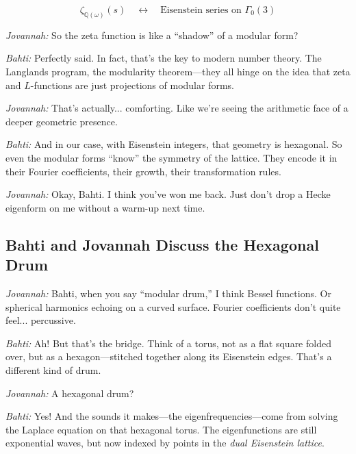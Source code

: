 \[
\zeta_{\mathbb{Q}(\omega)}(s) \quad \longleftrightarrow \quad \text{Eisenstein series on } \Gamma_0(3)
\]

\medskip

\noindent
\textit{Jovannah:} So the zeta function is like a “shadow” of a modular form?

\medskip

\noindent
\textit{Bahti:} Perfectly said. In fact, that’s the key to modern number theory. The Langlands program, the modularity theorem—they all hinge on the idea that zeta and \( L \)-functions are just projections of modular forms.

\medskip

\noindent
\textit{Jovannah:} That’s actually... comforting. Like we’re seeing the arithmetic face of a deeper geometric presence.

\medskip

\noindent
\textit{Bahti:} And in our case, with Eisenstein integers, that geometry is hexagonal. So even the modular forms “know” the symmetry of the lattice. They encode it in their Fourier coefficients, their growth, their transformation rules.

\medskip

\noindent
\textit{Jovannah:} Okay, Bahti. I think you’ve won me back. Just don’t drop a Hecke eigenform on me without a warm-up next time.

\subsection*{Bahti and Jovannah Discuss the Hexagonal Drum}
\textit{Jovannah:} Bahti, when you say “modular drum,” I think Bessel functions. Or spherical harmonics echoing on a curved surface. Fourier coefficients don’t quite feel... percussive.

\medskip

\noindent
\textit{Bahti:} Ah! But that’s the bridge. Think of a torus, not as a flat square folded over, but as a hexagon—stitched together along its Eisenstein edges. That’s a different kind of drum.

\medskip

\noindent
\textit{Jovannah:} A hexagonal drum?

\medskip

\noindent
\textit{Bahti:} Yes! And the sounds it makes—the eigenfrequencies—come from solving the Laplace equation on that hexagonal torus. The eigenfunctions are still exponential waves, but now indexed by points in the \emph{dual Eisenstein lattice}.

